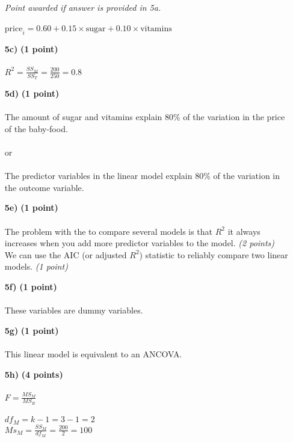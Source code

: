 \begin{itemize}
\textit{Point awarded if answer is provided in 5a.} \\ \\ 
$\text{price}_i = 0.60 + 0.15 \times \text{sugar} + 0.10 \times \text{vitamins}$ \\
\item[\textbf{5c)}] \textbf{(1 point)} \\ \\ 
$R^2 = \frac{SS_M}{SS_T} = \frac{200}{250} = 0.8$ \\
\item[\textbf{5d)}] \textbf{(1 point)} \\ \\ 
The amount of sugar and vitamins explain 80\% of the variation in the price of the baby-food. \\ \\ 
or \\ \\ 
The predictor variables in the linear model explain 80\% of the variation in the outcome variable. \\
\item[\textbf{5e)}] \textbf{(1 point)} \\ \\
The problem with the to compare several models is that $R^2$ it always \\increases when you add more predictor variables to the model. \textit{(2 points)} \\
We can use the AIC (or adjusted $R^2$) statistic to reliably compare two linear models. \textit{(1 point)} \\
\item[\textbf{5f)}] \textbf{(1 point)} \\ \\
These variables are dummy variables. \\
\item[\textbf{5g)}] \textbf{(1 point)} \\ \\
This linear model is equivalent to an ANCOVA. \\
\item[\textbf{5h)}] \textbf{(4 points)} \\ \\
$F = \frac{MS_M}{MS_R}$ \\ \\
$df_M = k-1=3-1=2$ \\
$Ms_M = \frac{SS_M}{df_M} = \frac{200}{2} = 100$ \\ \\

\end{itemize}
